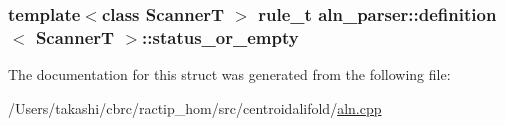 \hypertarget{structaln__parser_1_1definition_a9e5a7d05e2136f5f5870d98e5c732394}{
\subsubsection[{status\+\_\+or\+\_\+empty}]{\setlength{\rightskip}{0pt plus 5cm}template$<$class Scanner\+T $>$ {\bf rule\+\_\+t} {\bf aln\+\_\+parser\+::definition}$<$ Scanner\+T $>$\+::status\+\_\+or\+\_\+empty}}\label{structaln__parser_1_1definition_a9e5a7d05e2136f5f5870d98e5c732394}


The documentation for this struct was generated from the following file\+:\begin{DoxyCompactItemize}
\item 
/\+Users/takashi/cbrc/ractip\+\_\+hom/src/centroidalifold/\hyperlink{aln_8cpp}{aln.\+cpp}\end{DoxyCompactItemize}
